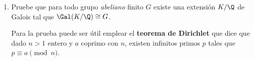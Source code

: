\documentclass[11pt, reqno]{amsart}
\begin{document}
\begin{enumerate}

	\item\label{exr:inverse_gal_ab}\lookst
		Pruebe que para todo grupo \emph{abeliano} finito $G$ existe una extensión $K/\Q$ de Galois tal que
		$\Gal(K/\Q) \cong G$.

		\begin{hint}
			Para la prueba puede ser útil emplear el \textbf{teorema de Dirichlet} que dice que
			dado $n > 1$ entero y $a$ coprimo con $n$, existen infinitos primos $p$ tales que $p \equiv a
			\pmod n$.
		\end{hint}
\end{enumerate}
\end{document}
